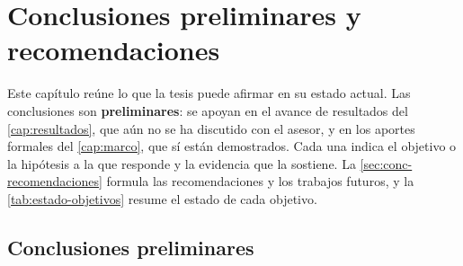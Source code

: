 \chapter{Conclusiones preliminares y recomendaciones}
\label{cap:conclusiones}

Este capítulo reúne lo que la tesis puede afirmar en su estado actual. Las conclusiones son
\textbf{preliminares}: se apoyan en el avance de resultados del \cref{cap:resultados}, que aún no se
ha discutido con el asesor, y en los aportes formales del \cref{cap:marco}, que sí están
demostrados. Cada una indica el objetivo o la hipótesis a la que responde y la evidencia que la
sostiene. La \cref{sec:conc-recomendaciones} formula las recomendaciones y los trabajos futuros, y
la \cref{tab:estado-objetivos} resume el estado de cada objetivo.

\section{Conclusiones preliminares}
\label{sec:conc-conclusiones}

